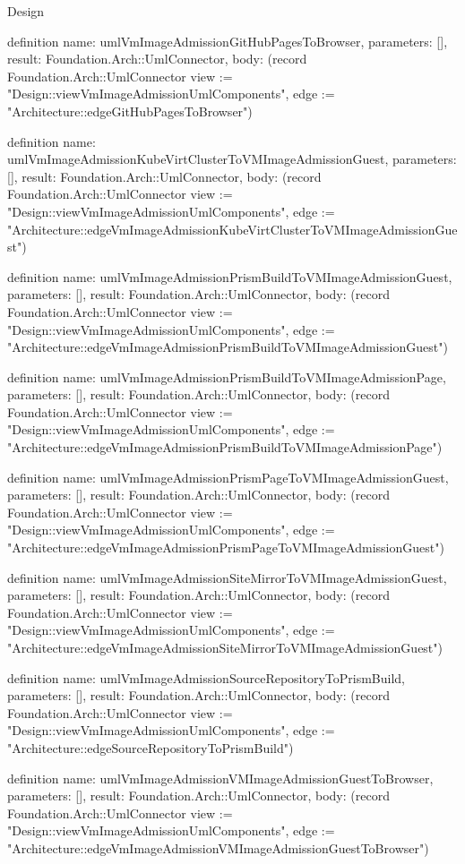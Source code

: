 \begin{lexlean}{Design}
\begin{semanticmodule}
definition{
  name: umlVmImageAdmissionGitHubPagesToBrowser,
  parameters: [],
  result: Foundation.Arch::UmlConnector,
  body: (record Foundation.Arch::UmlConnector {view := "Design::viewVmImageAdmissionUmlComponents", edge := "Architecture::edgeGitHubPagesToBrowser"})
}

definition{
  name: umlVmImageAdmissionKubeVirtClusterToVMImageAdmissionGuest,
  parameters: [],
  result: Foundation.Arch::UmlConnector,
  body: (record Foundation.Arch::UmlConnector {view := "Design::viewVmImageAdmissionUmlComponents", edge := "Architecture::edgeVmImageAdmissionKubeVirtClusterToVMImageAdmissionGuest"})
}

definition{
  name: umlVmImageAdmissionPrismBuildToVMImageAdmissionGuest,
  parameters: [],
  result: Foundation.Arch::UmlConnector,
  body: (record Foundation.Arch::UmlConnector {view := "Design::viewVmImageAdmissionUmlComponents", edge := "Architecture::edgeVmImageAdmissionPrismBuildToVMImageAdmissionGuest"})
}

definition{
  name: umlVmImageAdmissionPrismBuildToVMImageAdmissionPage,
  parameters: [],
  result: Foundation.Arch::UmlConnector,
  body: (record Foundation.Arch::UmlConnector {view := "Design::viewVmImageAdmissionUmlComponents", edge := "Architecture::edgeVmImageAdmissionPrismBuildToVMImageAdmissionPage"})
}

definition{
  name: umlVmImageAdmissionPrismPageToVMImageAdmissionGuest,
  parameters: [],
  result: Foundation.Arch::UmlConnector,
  body: (record Foundation.Arch::UmlConnector {view := "Design::viewVmImageAdmissionUmlComponents", edge := "Architecture::edgeVmImageAdmissionPrismPageToVMImageAdmissionGuest"})
}

definition{
  name: umlVmImageAdmissionSiteMirrorToVMImageAdmissionGuest,
  parameters: [],
  result: Foundation.Arch::UmlConnector,
  body: (record Foundation.Arch::UmlConnector {view := "Design::viewVmImageAdmissionUmlComponents", edge := "Architecture::edgeVmImageAdmissionSiteMirrorToVMImageAdmissionGuest"})
}

definition{
  name: umlVmImageAdmissionSourceRepositoryToPrismBuild,
  parameters: [],
  result: Foundation.Arch::UmlConnector,
  body: (record Foundation.Arch::UmlConnector {view := "Design::viewVmImageAdmissionUmlComponents", edge := "Architecture::edgeSourceRepositoryToPrismBuild"})
}

definition{
  name: umlVmImageAdmissionVMImageAdmissionGuestToBrowser,
  parameters: [],
  result: Foundation.Arch::UmlConnector,
  body: (record Foundation.Arch::UmlConnector {view := "Design::viewVmImageAdmissionUmlComponents", edge := "Architecture::edgeVmImageAdmissionVMImageAdmissionGuestToBrowser"})
}


\end{semanticmodule}
\end{lexlean}
